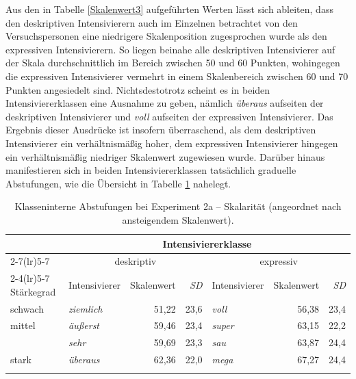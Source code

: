 %
\noindent Aus den in Tabelle \ref{Skalenwert3} aufgeführten Werten lässt sich ableiten, dass den deskriptiven Intensivierern auch im Einzelnen betrachtet von den Versuchspersonen eine niedrigere Skalenposition zugesprochen wurde als den expressiven Intensivierern. So liegen beinahe alle deskriptiven Intensivierer auf der Skala durchschnittlich im Bereich zwischen 50 und 60 Punkten, wohingegen die expressiven Intensivierer vermehrt in einem Skalenbereich zwischen 60 und 70 Punkten angesiedelt sind. Nichtsdestotrotz scheint es in beiden Intensiviererklassen eine Ausnahme zu geben, nämlich \textit{überaus} aufseiten der deskriptiven Intensivierer und \textit{voll} aufseiten der expressiven Intensivierer. Das Ergebnis dieser Ausdrücke ist insofern überraschend, als dem deskriptiven Intensivierer ein verhältnismäßig hoher, dem expressiven Intensivierer hingegen ein verhältnismäßig niedriger Skalenwert zugewiesen wurde. Darüber hinaus manifestieren sich in beiden Intensiviererklassen tatsächlich graduelle Abstufungen, wie die Übersicht in Tabelle \ref{schwach0} nahelegt.


\begin{table}
\small
\begin{tabularx}{\textwidth}{X@{} lrr lrr }
\lsptoprule
 &  \multicolumn{6}{c}{\textbf{Intensiviererklasse}}  \\
\cmidrule(lr){2-7}\cmidrule(lr){5-7}
& \multicolumn{3}{c}{{deskriptiv}} & \multicolumn{3}{c}{{expressiv}}  \\
\cmidrule(lr){2-4}\cmidrule(lr){5-7}
{Stärkegrad}  & Intensivierer & Skalenwert& \textit{SD}  & Intensivierer & Skalenwert& \textit{SD}   \\
\midrule
schwach & \textit{ziemlich} & 51,22& 23,6 & \textit{voll} & 56,38 & 23,4 \\
\multicolumn{1}{l}{mittel} & \textit{äußerst} & 59,46& 23,4  & \textit{super} & 63,15 & 22,2\\
 & \textit{sehr} & 59,69& 23,3 & \textit{sau} & 63,87& 24,4\\
stark & \textit{überaus} & 62,36& 22,0 & \textit{mega} & 67,27 & 24,4 \\
\lspbottomrule

\end{tabularx}
\caption[Klasseninterne Abstufungen bei Experiment 2a]{Klasseninterne Abstufungen bei Experiment 2a -- Skalarität (angeordnet nach ansteigendem Skalenwert).}
\label{schwach0}
\end{table}


